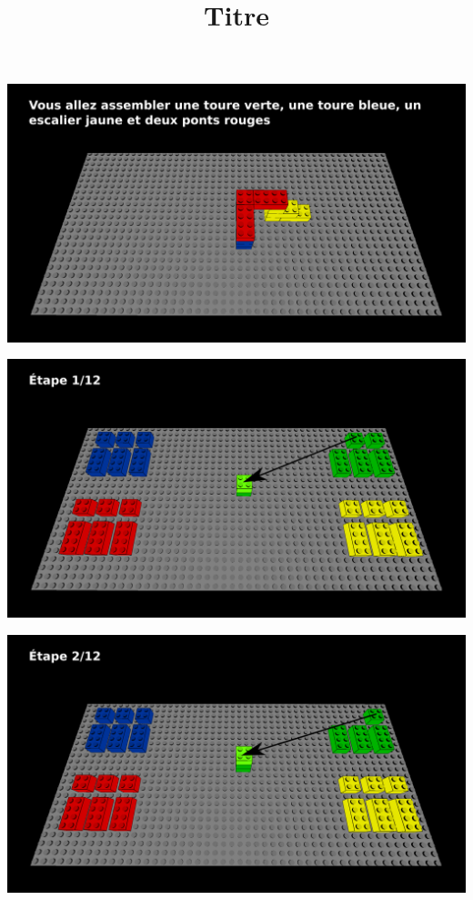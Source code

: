 \documentclass[aspectratio=169]{beamer}
\title{Titre}
\begin{document}
\begin{frame}
    \begin{center}
        \includegraphics[width=\linewidth]{figure.png}
    \end{center}
\end{frame}

\begin{frame}
  \includegraphics[width=\linewidth]{step1.png}
\end{frame}

\begin{frame}
  \includegraphics[width=\linewidth]{step2.png}
\end{frame}
\end{document}
